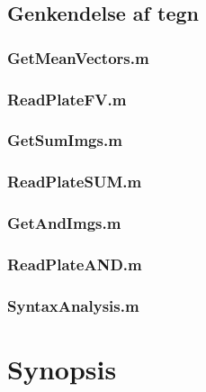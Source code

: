 \documentclass[11pt,a4paper,final]{article}
\begin{document}
\subsection{Genkendelse af tegn}
\subsubsection{GetMeanVectors.m}
\label{code:GetMeanVectors}


\subsubsection{ReadPlateFV.m}
\label{code:ReadPlateFV}


\subsubsection{GetSumImgs.m}
\label{code:GetSumImgs}


\subsubsection{ReadPlateSUM.m}
\label{code:ReadPlateSUM}


\subsubsection{GetAndImgs.m}
\label{code:GetAndImgs}


\subsubsection{ReadPlateAND.m}
\label{code:ReadPlateAND}


\subsubsection{SyntaxAnalysis.m}
\label{code:SyntaxAnalysis}



\newpage
\section{Synopsis}

\end{document}
